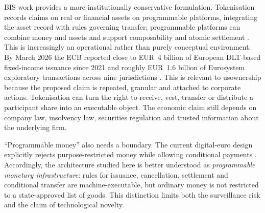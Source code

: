 BIS work provides a more institutionally conservative formulation. Tokenisation records claims on real or financial assets on programmable platforms, integrating the asset record with rules governing transfer; programmable platforms can combine money and assets and support composability and atomic settlement \citep{bis2022,bis2023,bis2025,bis2026}. This is increasingly an operational rather than purely conceptual environment. By March 2026 the ECB reported close to EUR~4 billion of European DLT-based fixed-income issuance since 2021 and roughly EUR~1.6 billion of Eurosystem exploratory transactions across nine jurisdictions \citep{cipollone2026}. This is relevant to usownership because the proposed claim is repeated, granular and attached to corporate actions. Tokenisation can turn the right to receive, vest, transfer or distribute a participant share into an executable object. The economic claim still depends on company law, insolvency law, securities regulation and trusted information about the underlying firm.

``Programmable money'' also needs a boundary. The current digital-euro design explicitly rejects purpose-restricted money while allowing conditional payments \citep{ecbfaq2026}. Accordingly, the architecture studied here is better understood as \emph{programmable monetary infrastructure}: rules for issuance, cancellation, settlement and conditional transfer are machine-executable, but ordinary money is not restricted to a state-approved list of goods. This distinction limits both the surveillance risk and the claim of technological novelty.

